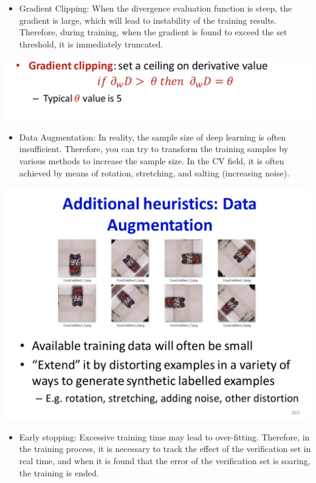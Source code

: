 \documentclass{article}
\begin{document}
	\begin{itemize}
		\item Gradient Clipping: When the divergence evaluation function is steep, the gradient is large, which will lead to instability of the training results. Therefore, during training, when the gradient is found to exceed the set threshold, it is immediately truncated.
	\end{itemize}

	
	\includegraphics[scale=0.2]{108.png}
	
	\begin{itemize}
		\item Data Augmentation: In reality, the sample size of deep learning is often insufficient. Therefore, you can try to transform the training samples by various methods to increase the sample size. In the CV field, it is often achieved by means of rotation, stretching, and salting (increasing noise).
	\end{itemize}
	
	
	\includegraphics[scale=0.2]{109.png}
	
	\begin{itemize}
		\item Early stopping: Excessive training time may lead to over-fitting. Therefore, in the training process, it is necessary to track the effect of the verification set in real time, and when it is found that the error of the verification set is soaring, the training is ended.
	\end{itemize}
\end{document}
